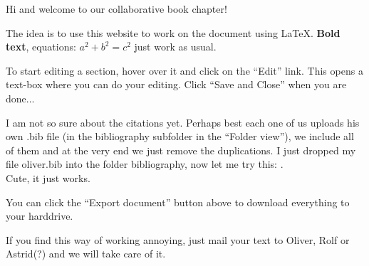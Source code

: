 Hi and welcome to our collaborative book chapter!  

The idea is to use this website to work on the document using \LaTeX.  \textbf{Bold text}, equations: $a^2+b^2=c^2$ just work as usual.  

To start editing a section, hover over it and click on the ``Edit'' link.  This opens a text-box where you can do your editing.  Click ``Save and Close'' when you are done...

I am not so sure about the citations yet.  Perhaps best each one of us uploads his own .bib file (in the bibliography subfolder in the ``Folder view''), we include all of them and at the very end we just remove the duplications.  
I just dropped my file oliver.bib into the folder bibliography, now let me try this: \cite{buehler2012}.\\
Cute, it just works.  

You can click the ``Export document'' button above to download everything to your harddrive.  

If you find this way of working annoying, just mail your text to Oliver, Rolf or Astrid(?) and we will take care of it.  